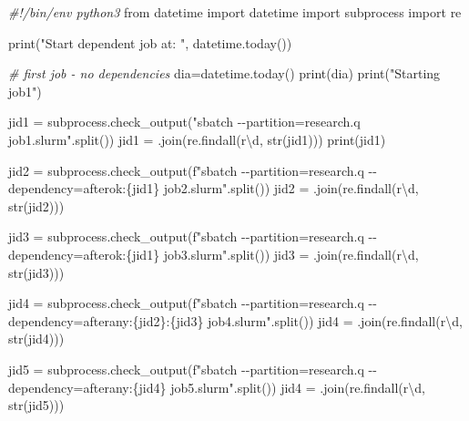 \documentclass[]{article}
\newenvironment{Shaded}{\begin{snugshade}}{\end{snugshade}}
\newcommand{\CommentTok}[1]{\textcolor[rgb]{0.56,0.35,0.01}{\textit{#1}}}
\newcommand{\ExtensionTok}[1]{#1}
\newcommand{\NormalTok}[1]{#1}
\newcommand{\StringTok}[1]{\textcolor[rgb]{0.31,0.60,0.02}{#1}}
\newcommand{\VariableTok}[1]{\textcolor[rgb]{0.00,0.00,0.00}{#1}}
\begin{document}
\begin{Shaded}
\begin{Highlighting}[]
\CommentTok{\#!/bin/env python3}
\ExtensionTok{from}\NormalTok{ datetime import datetime}
\ExtensionTok{import}\NormalTok{ subprocess}
\ExtensionTok{import}\NormalTok{ re}

\ExtensionTok{print}\NormalTok{(}\StringTok{"Start dependent job at: "}\NormalTok{, datetime.today())}

\CommentTok{\# first job {-} no dependencies}
\VariableTok{dia=}\NormalTok{datetime.today}\VariableTok{()}
\ExtensionTok{print}\NormalTok{(dia)}
\ExtensionTok{print}\NormalTok{(}\StringTok{"Starting job1"}\NormalTok{)}


\ExtensionTok{jid1}\NormalTok{ = subprocess.check\_output(}\StringTok{"sbatch {-}{-}partition=research.q job1.slurm"}\NormalTok{.split())}
\ExtensionTok{jid1}\NormalTok{ = }\StringTok{\textquotesingle{}\textquotesingle{}}\NormalTok{.join(re.findall(r}\StringTok{\textquotesingle{}\textbackslash{}d\textquotesingle{}}\NormalTok{, str(jid1)))}
\ExtensionTok{print}\NormalTok{(jid1)}

\ExtensionTok{jid2}\NormalTok{ = subprocess.check\_output(f}\StringTok{"sbatch  {-}{-}partition=research.q {-}{-}dependency=afterok:\{jid1\} job2.slurm"}\NormalTok{.split())}
\ExtensionTok{jid2}\NormalTok{ = }\StringTok{\textquotesingle{}\textquotesingle{}}\NormalTok{.join(re.findall(r}\StringTok{\textquotesingle{}\textbackslash{}d\textquotesingle{}}\NormalTok{, str(jid2)))}

\ExtensionTok{jid3}\NormalTok{ = subprocess.check\_output(f}\StringTok{"sbatch  {-}{-}partition=research.q {-}{-}dependency=afterok:\{jid1\} job3.slurm"}\NormalTok{.split())}
\ExtensionTok{jid3}\NormalTok{ = }\StringTok{\textquotesingle{}\textquotesingle{}}\NormalTok{.join(re.findall(r}\StringTok{\textquotesingle{}\textbackslash{}d\textquotesingle{}}\NormalTok{, str(jid3)))}

\ExtensionTok{jid4}\NormalTok{ = subprocess.check\_output(f}\StringTok{"sbatch  {-}{-}partition=research.q {-}{-}dependency=afterany:\{jid2\}:\{jid3\} job4.slurm"}\NormalTok{.split())}
\ExtensionTok{jid4}\NormalTok{ = }\StringTok{\textquotesingle{}\textquotesingle{}}\NormalTok{.join(re.findall(r}\StringTok{\textquotesingle{}\textbackslash{}d\textquotesingle{}}\NormalTok{, str(jid4)))}

\ExtensionTok{jid5}\NormalTok{ = subprocess.check\_output(f}\StringTok{"sbatch  {-}{-}partition=research.q {-}{-}dependency=afterany:\{jid4\} job5.slurm"}\NormalTok{.split())}
\ExtensionTok{jid4}\NormalTok{ = }\StringTok{\textquotesingle{}\textquotesingle{}}\NormalTok{.join(re.findall(r}\StringTok{\textquotesingle{}\textbackslash{}d\textquotesingle{}}\NormalTok{, str(jid5)))}


\end{Highlighting}
\end{Shaded}
\end{document}
